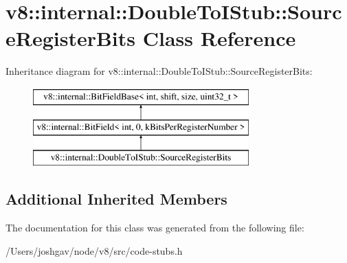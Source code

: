 \hypertarget{classv8_1_1internal_1_1_double_to_i_stub_1_1_source_register_bits}{}\section{v8\+:\+:internal\+:\+:Double\+To\+I\+Stub\+:\+:Source\+Register\+Bits Class Reference}
\label{classv8_1_1internal_1_1_double_to_i_stub_1_1_source_register_bits}
Inheritance diagram for v8\+:\+:internal\+:\+:Double\+To\+I\+Stub\+:\+:Source\+Register\+Bits\+:\begin{figure}[H]
\begin{center}
\leavevmode
\includegraphics[height=3.000000cm]{classv8_1_1internal_1_1_double_to_i_stub_1_1_source_register_bits}
\end{center}
\end{figure}
\subsection*{Additional Inherited Members}


The documentation for this class was generated from the following file\+:\begin{DoxyCompactItemize}
\item 
/\+Users/joshgav/node/v8/src/code-\/stubs.\+h\end{DoxyCompactItemize}

